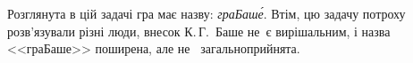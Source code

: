 Розглянута в цій задачі гра %
має %
назву: \emph{гра\nolinebreak[3] Баш\'{е}}. Втім, 
цю задачу
потроху розв'язували різні люди, внесок К.$\,$Г.~Баше 
не~є
вирішальним, і назва <<гра\nolinebreak[3] Баше>> поширена, але не~%
загальноприйнята.